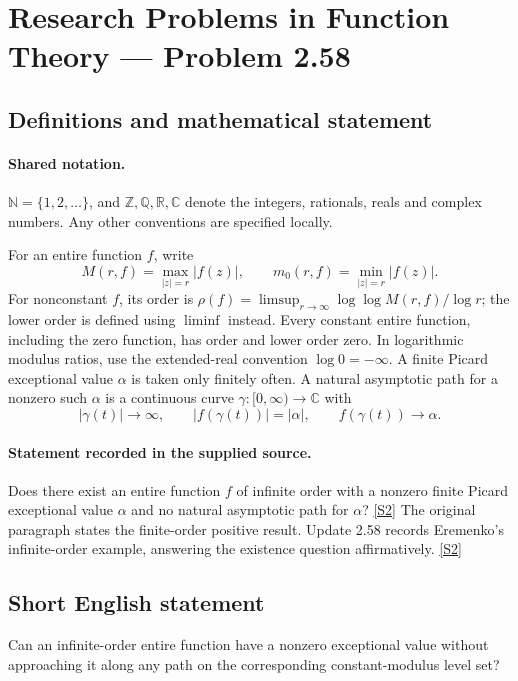 \documentclass[11pt]{article}
\newcommand{\sref}[2]{\hyperlink{source:#1:#2}{[S#2]}}
\begin{document}
\section{Research Problems in Function Theory — Problem 2.58}\label{statement}

\subsection{Definitions and mathematical statement}

\paragraph{Shared notation.}$\mathbb N=\{1,2,\ldots\}$, and $\mathbb Z,\mathbb Q,\mathbb R,\mathbb C$ denote the integers, rationals, reals and complex numbers. Any other conventions are specified locally.


For an entire function $f$, write
\[
 M(r,f)=\max_{|z|=r}|f(z)|,\qquad m_0(r,f)=\min_{|z|=r}|f(z)|.
\]
For nonconstant $f$, its order is $\rho(f)=\limsup_{r\to\infty}\log\log M(r,f)/\log r$;
the lower order is defined using $\liminf$ instead. Every constant entire function, including the zero function, has order and lower order zero. In logarithmic modulus ratios, use the extended-real convention $\log0=-\infty$.
A finite Picard exceptional value $\alpha$ is taken only finitely often. A natural asymptotic path for a nonzero such $\alpha$ is a continuous curve $\gamma:[0,\infty)\to\mathbb C$ with
\[|\gamma(t)|\to\infty,\qquad |f(\gamma(t))|=|\alpha|,\qquad f(\gamma(t))\to\alpha.\]

\paragraph{Statement recorded in the supplied source.}
Does there exist an entire function $f$ of infinite order with a nonzero finite Picard exceptional value $\alpha$ and no natural asymptotic path for $\alpha$? \sref{statement}{2}
The original paragraph states the finite-order positive result. Update 2.58 records Eremenko's infinite-order example, answering the existence question affirmatively. \sref{statement}{2}
\subsection{Short English statement}
Can an infinite-order entire function have a nonzero exceptional value without approaching it along any path on the corresponding constant-modulus level set?
\end{document}
